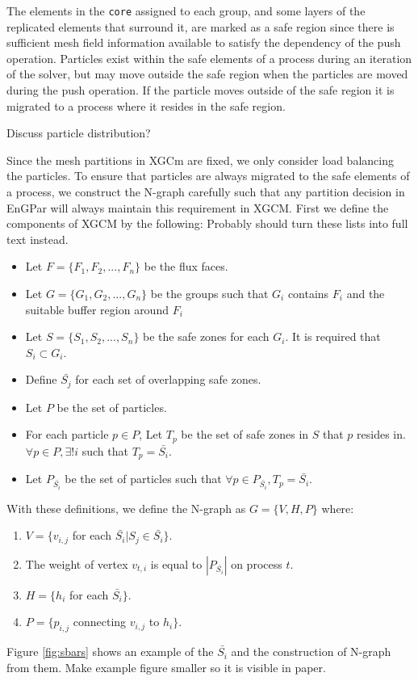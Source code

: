 \documentclass[conference]{IEEEtran}
\begin{document}
The elements in the \texttt{core} assigned to each group, and some layers of the
replicated elements that surround it, are marked as a safe region since there is
sufficient mesh field information available to satisfy the dependency of the
push operation.
Particles exist within the safe elements of a process during an iteration of the
solver, but may move outside the safe region when the particles are moved during
the push operation.
If the particle moves outside of the safe region it is migrated to a process
where it resides in the safe region.

{\color{red} Discuss particle distribution?}

Since the mesh partitions in XGCm are fixed, we only consider
load balancing the particles. To ensure that particles are always migrated to the safe elements
of a process, we construct the N-graph carefully such that any partition
decision in EnGPar will always maintain this requirement in XGCM. First we define
the components of XGCM by the following:
{\color{red} Probably should turn these lists into full text instead.}
\begin{itemize}
\item Let $F = \{F_1,F_2, ..., F_n\}$ be the flux faces.
\item Let $G = \{G_1, G_2, ..., G_n\}$ be the groups such that $G_i$
  contains $F_i$ and the suitable buffer region around $F_i$
\item Let $S = \{S_1,S_2,...,S_n\}$ be the safe zones for each $G_i$.
  It is required that $S_i \subset G_i$.
\item Define $\bar{S_j}$ for each set of overlapping safe zones.
\item Let $P$ be the set of particles.
\item For each particle $p\in P$, Let $T_p$ be the set of safe zones in $S$ that $p$ resides
  in.  $\forall p \in P, \exists ! i$ such that $T_p = \bar{S_i}$.
\item  Let $P_{\bar{S_i}}$ be the set of particles such that $\forall p \in P_{\bar{S_i}}, T_p = \bar{S_i}$.
\end{itemize}

With these definitions, we define the N-graph as $G = \{V, H, P\}$ where:
\begin{enumerate}
\item $V = \{ v_{i,j}$ for each $\bar{S_i} | S_j \in \bar{S_i} \}$.
\item The weight of vertex $v_{t,i}$ is equal to $|P_{\bar{S_i}}|$ on process $t$.
\item $H = \{ h_i$ for each $\bar{S_i} \}$.
\item $P = \{ p_{i,j}$ connecting $v_{i,j}$ to $h_i \}$.
\end{enumerate}
Figure \ref{fig:sbars} shows an example of the $\bar{S_i}$ and the construction of N-graph from
them. {\color{red} Make example figure smaller so it is visible in paper.}
\end{document}
